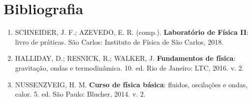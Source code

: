 \section{Bibliografia}

\begin{enumerate}
    \item SCHNEIDER, J. F.; AZEVEDO, E. R. (comp.). \textbf{Laboratório de Física II}: livro de práticas. São Carlos: Instituto de Física de São Carlos, 2018.
    \item HALLIDAY, D.; RESNICK, R.; WALKER, J. \textbf{Fundamentos de física}: gravitação, ondas e termodinâmica. 10. ed. Rio de Janeiro: LTC, 2016. v. 2.
    \item NUSSENZVEIG, H. M. \textbf{Curso de física básica}: fluidos, oscilações e ondas, calor. 5. ed. São Paulo: Blucher, 2014. v. 2.
\end{enumerate}

